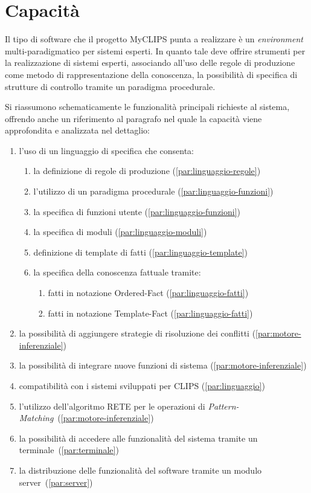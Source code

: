%

\section{Capacità}

Il tipo di software che il progetto MyCLIPS punta a realizzare è un \emph{environment} multi-paradigmatico per sistemi esperti. In quanto tale deve offrire strumenti per la realizzazione di sistemi esperti, associando all'uso delle regole di produzione come metodo di rappresentazione della conoscenza, la possibilità di specifica di strutture di controllo tramite un paradigma procedurale.


Si riassumono schematicamente le funzionalità principali richieste al sistema, offrendo anche un riferimento al paragrafo nel quale la capacità viene approfondita e analizzata nel dettaglio:

\begin{enumerate}
	\item l'uso di un linguaggio di specifica che consenta:
		\begin{enumerate}
			\item la definizione di regole di produzione (\ref{par:linguaggio-regole})
			\item l'utilizzo di un paradigma procedurale (\ref{par:linguaggio-funzioni})
			\item la specifica di funzioni utente (\ref{par:linguaggio-funzioni})
			\item la specifica di moduli (\ref{par:linguaggio-moduli})
			\item definizione di template di fatti (\ref{par:linguaggio-template})
			\item la specifica della conoscenza fattuale tramite:
				\begin{enumerate}
					\item fatti in notazione Ordered-Fact (\ref{par:linguaggio-fatti})
					\item fatti in notazione Template-Fact (\ref{par:linguaggio-fatti})
				\end{enumerate}
		\end{enumerate}
	\item la possibilità di aggiungere strategie di risoluzione dei conflitti (\ref{par:motore-inferenziale})
	\item la possibilità di integrare nuove funzioni di sistema (\ref{par:motore-inferenziale})
	\item compatibilità con i sistemi sviluppati per CLIPS (\ref{par:linguaggio})
	\item l'utilizzo dell'algoritmo RETE per le operazioni di \emph{Pattern-Matching}~(\ref{par:motore-inferenziale})
	\item la possibilità di accedere alle funzionalità del sistema tramite un terminale~(\ref{par:terminale})
	\item la distribuzione delle funzionalità del software tramite un modulo server~(\ref{par:server})
\end{enumerate}



